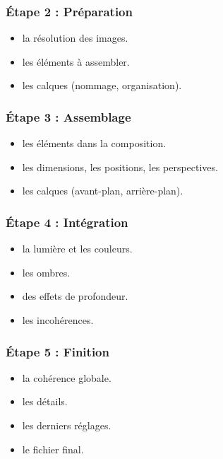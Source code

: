 \subsubsection{Étape 2 : Préparation}

\begin{itemize}
    \item {} la résolution des images.
    \item {} les éléments à assembler.
    \item {} les calques (nommage, organisation).
\end{itemize}

\subsubsection{Étape 3 : Assemblage}

\begin{itemize}
    \item {} les éléments dans la composition.
    \item {} les dimensions, les positions, les perspectives.
    \item {} les calques (avant-plan, arrière-plan).
\end{itemize}

\subsubsection{Étape 4 : Intégration}

\begin{itemize}
    \item {} la lumière et les couleurs.
    \item {} les ombres.
    \item {} des effets de profondeur.
    \item {} les incohérences.
\end{itemize}

\subsubsection{Étape 5 : Finition}

\begin{itemize}
    \item {} la cohérence globale.
    \item {} les détails.
    \item {} les derniers réglages.
    \item {} le fichier final.
\end{itemize}


